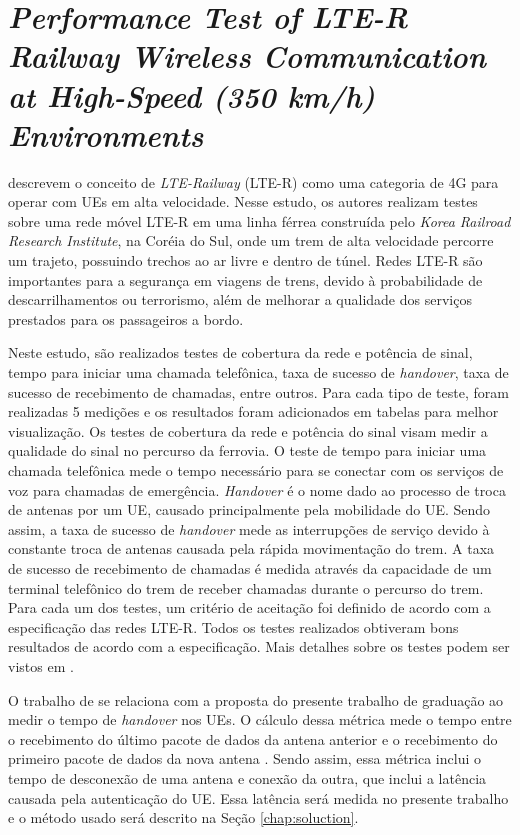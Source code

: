 \section{\textit{Performance Test of LTE-R Railway Wireless Communication at High-Speed (350 km/h) Environments}}

 descrevem o conceito de \textit{LTE-Railway} (LTE-R) como uma categoria de 4G para operar com UEs em alta velocidade.
Nesse estudo, os autores realizam testes sobre uma rede móvel LTE-R em uma linha férrea construída pelo \textit{Korea Railroad Research Institute}, na Coréia do Sul, onde um trem de alta velocidade percorre um trajeto, possuindo trechos ao ar livre e dentro de túnel.
Redes LTE-R são importantes para a segurança em viagens de trens, devido à probabilidade de descarrilhamentos ou terrorismo, além de melhorar a qualidade dos serviços prestados para os passageiros a bordo.

Neste estudo, são realizados testes de cobertura da rede e potência de sinal, tempo para iniciar uma chamada telefônica, taxa de sucesso de \textit{handover}, taxa de sucesso de recebimento de chamadas, entre outros.
Para cada tipo de teste, foram realizadas 5 medições e os resultados foram adicionados em tabelas para melhor visualização.
Os testes de cobertura da rede e potência do sinal visam medir a qualidade do sinal no percurso da ferrovia.
O teste de tempo para iniciar uma chamada telefônica mede o tempo necessário para se conectar com os serviços de voz para chamadas de emergência.
\textit{Handover} é o nome dado ao processo de troca de antenas por um UE, causado principalmente pela mobilidade do UE. Sendo assim, a taxa de sucesso de \textit{handover} mede as interrupções de serviço devido à constante troca de antenas causada pela rápida movimentação do trem.
A taxa de sucesso de recebimento de chamadas é medida através da capacidade de um terminal telefônico do trem de receber chamadas durante o percurso do trem.
Para cada um dos testes, um critério de aceitação foi definido de acordo com a especificação das redes LTE-R. Todos os testes realizados obtiveram bons resultados de acordo com a especificação. Mais detalhes sobre os testes podem ser vistos em .

O trabalho de  se relaciona com a proposta do presente trabalho de graduação ao medir o tempo de \textit{handover} nos UEs.
O cálculo dessa métrica mede o tempo entre o recebimento do último pacote de dados da antena anterior e o recebimento do primeiro pacote de dados da nova antena \cite{Tayyab2019}.
Sendo assim, essa métrica inclui o tempo de desconexão de uma antena e conexão da outra, que inclui a latência causada pela autenticação do UE.
Essa latência será medida no presente trabalho e o método usado será descrito na Seção \ref{chap:soluction}.
